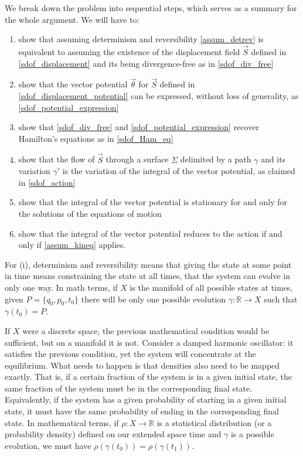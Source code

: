 \documentclass[10pt,twocolumn, nofootinbib]{revtex4-2}
\begin{document}
We break down the problem into sequential steps, which serves as a summary for the whole argument. We will have to:
\begin{enumerate}[label=(\roman*)]
	\item show that assuming determinism and reversibility \ref{assum_detrev} is equivalent to assuming the existence of the displacement field $\vec{S}$ defined in \ref{sdof_displacement} and its being divergence-free as in \ref{sdof_div_free}
	\item show that the vector potential $\vec{\theta}$ for $\vec{S}$ defined in \ref{sdof_displacement_potential} can be expressed, without loss of generality, as \ref{sdof_potential_expression}
	\item show that \ref{sdof_div_free} and \ref{sdof_potential_expression} recover Hamilton's equations as in \ref{sdof_Ham_eq}
	\item show that the flow of $\vec{S}$ through a surface $\Sigma$ delimited by a path $\gamma$ and its variation $\gamma'$ is the variation of the integral of the vector potential, as claimed in \ref{sdof_action}
	\item show that the integral of the vector potential is stationary for and only for the solutions of the equations of motion
	\item show that the integral of the vector potential reduces to the action if and only if \ref{assum_kineq} applies.
\end{enumerate}

For (i), determinism and reversibility means that giving the state at some point in time means constraining the state at all times, that the system can evolve in only one way. In math terms, if $X$ is the manifold of all possible states at times, given $P = \{q_0, p_0, t_0\}$ there will be only one possible evolution $\gamma : \mathbb{R} \to X$ such that $\gamma(t_0) = P$.

If $X$ were a discrete space, the previous mathematical condition would be sufficient, but on a manifold it is not. Consider a damped harmonic oscillator: it satisfies the previous condition, yet the system will concentrate at the equilibrium. What needs to happen is that densities also need to be mapped exactly. That is, if a certain fraction of the system is in a given initial state, the same fraction of the system must be in the corresponding final state. Equivalently, if the system has a given probability of starting in a given initial state, it must have the same probability of ending in the corresponding final state. In mathematical terms, if $\rho : X \to \mathbb{R}$ is a statistical distribution (or a probability density) defined on our extended space time and $\gamma$ is a possible evolution, we must have $\rho(\gamma(t_0)) = \rho(\gamma(t_1))$.
\end{document}
